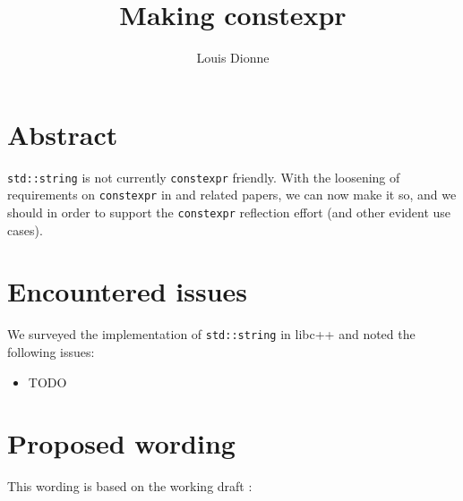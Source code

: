 \documentclass{wg21}
\title{Making \cc{std::string} constexpr}
\author{Louis Dionne}{ldionne@apple.com}
\newcommand{\cc}[1]{\texttt{#1}}
\begin{document}
\maketitle

\section{Abstract}
\cc{std::string} is not currently \cc{constexpr} friendly. With the loosening
of requirements on \cc{constexpr} in \cite{P0784R1} and related papers, we
can now make it so, and we should in order to support the \cc{constexpr}
reflection effort (and other evident use cases).


\section{Encountered issues}
We surveyed the implementation of \cc{std::string} in libc++ and noted the
following issues:
\begin{itemize}
  \item TODO
\end{itemize}


\section{Proposed wording}
This wording is based on the working draft \cite{N4727}:
\end{document}
